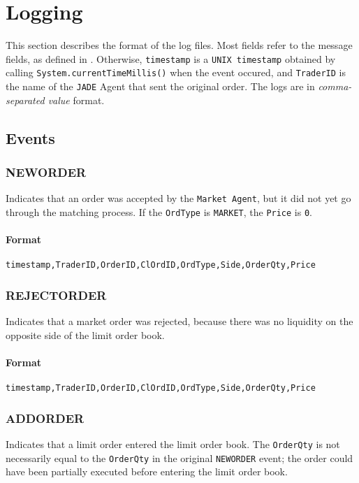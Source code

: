 \chapter{Logging}
\label{Appendix/Logging}
This section describes the format of the log files. Most fields refer to the message fields, as defined in . Otherwise, \texttt{timestamp} is a \texttt{UNIX timestamp} obtained by calling \texttt{System.currentTimeMillis()} when the event occured, and \texttt{TraderID} is the name of the \texttt{JADE} Agent that sent the original order. The logs are in \textit{comma-separated value} format.

\section{Events}

\subsection{NEWORDER}
Indicates that an order was accepted by the \texttt{Market Agent}, but it did not yet go through the matching process. If the \texttt{OrdType} is \texttt{MARKET}, the \texttt{Price} is \texttt{0}.

\subsubsection*{Format}
\texttt{timestamp,TraderID,OrderID,ClOrdID,OrdType,Side,OrderQty,Price}

\subsection{REJECTORDER}
Indicates that a market order was rejected, because there was no liquidity on the opposite side of the limit order book.

\subsubsection*{Format}
\texttt{timestamp,TraderID,OrderID,ClOrdID,OrdType,Side,OrderQty,Price}

\subsection{ADDORDER}
Indicates that a limit order entered the limit order book. The \texttt{OrderQty} is not necessarily equal to the \texttt{OrderQty} in the original \texttt{NEWORDER} event; the order could have been partially executed before entering the limit order book.

